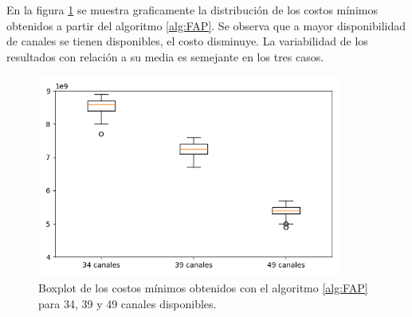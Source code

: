 En la figura \ref{fig:boxplot} se muestra graficamente la distribución de los costos mínimos obtenidos a partir del algoritmo \ref{alg:FAP}. Se observa que a mayor disponibilidad de canales se tienen disponibles, el costo disminuye. La variabilidad de los resultados con relación a su media es semejante en los tres casos.

\begin{figure}[H]
    \centering
    \includegraphics[width=10cm]{Graphics/boxplot.png}
    \caption{Boxplot de los costos mínimos obtenidos con el algoritmo \ref{alg:FAP} para 34, 39 y 49 canales disponibles.}
    \label{fig:boxplot}
\end{figure}

